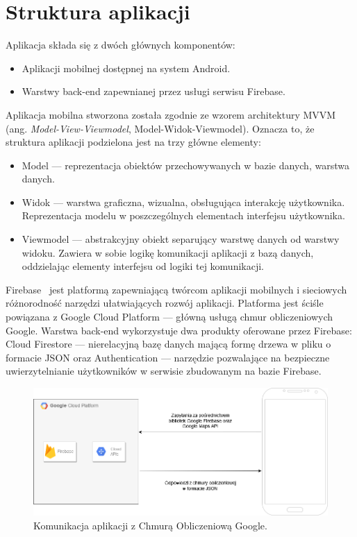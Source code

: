 \newpage
\section{Struktura aplikacji}\label{struktura}
\vspace{1cm}
    Aplikacja składa się z dwóch głównych komponentów: 
    \begin{itemize}
        \item Aplikacji mobilnej dostępnej na system Android.
        \item Warstwy back-end zapewnianej przez usługi serwisu Firebase. 
    \end{itemize}

    Aplikacja mobilna stworzona została zgodnie ze wzorem architektury MVVM (ang. \emph{Model-View-Viewmodel}, Model-Widok-Viewmodel). Oznacza to, że struktura aplikacji
    podzielona jest na trzy główne elementy: 
    \begin{itemize}
        \item Model — reprezentacja obiektów przechowywanych w bazie danych, warstwa danych.
        \item Widok — warstwa graficzna, wizualna, obsługująca interakcję użytkownika. Reprezentacja modelu w poszczególnych elementach interfejsu użytkownika.
        \item Viewmodel — abstrakcyjny obiekt separujący warstwę danych od warstwy widoku. Zawiera w sobie logikę komunikacji aplikacji z bazą danych,
        oddzielając elementy interfejsu od logiki tej komunikacji.
    \end{itemize}
    
    Firebase~\cite{FIREBASE_MAIN} jest platformą zapewniającą twórcom aplikacji mobilnych i sieciowych różnorodność narzędzi ułatwiających rozwój aplikacji. Platforma jest ściśle powiązana z 
    Google Cloud Platform — główną usługą chmur obliczeniowych Google. Warstwa back-end wykorzystuje dwa produkty oferowane przez Firebase: Cloud Firestore — 
    nierelacyjną bazę danych mającą formę drzewa w pliku o formacie JSON oraz Authentication — narzędzie pozwalające na bezpieczne uwierzytelnianie użytkowników 
    w serwisie zbudowanym na bazie Firebase. 

    \begin{figure}[!ht]%
        \centering
        \includegraphics[scale=0.45]{src/comunication with google cloud.png}
        \caption{Komunikacja aplikacji z Chmurą Obliczeniową Google.\label{communication}}
    \end{figure} 

